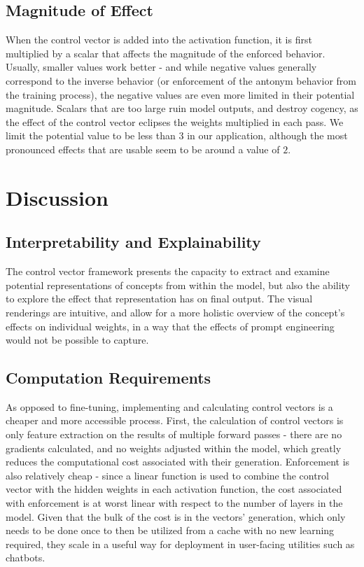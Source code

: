 \documentclass[11pt,a4paper]{article}
\begin{document}
\subsection{Magnitude of Effect}
When the control vector is added into the activation function, it is first multiplied by a scalar that affects the magnitude of the enforced behavior. Usually, smaller values work better - and while negative values generally correspond to the inverse behavior (or enforcement of the antonym behavior from the training process), the negative values are even more limited in their potential magnitude. Scalars that are too large ruin model outputs, and destroy cogency, as the effect of the control vector eclipses the weights multiplied in each pass. We limit the potential value to be less than $3$ in our application, although the most pronounced effects that are usable seem to be around a value of $2$.

\section{Discussion}
\subsection{Interpretability and Explainability}
The control vector framework presents the capacity to extract and examine potential representations of concepts from within the model, but also the ability to explore the effect that representation has on final output. The visual renderings are intuitive, and allow for a more holistic overview of the concept's effects on individual weights, in a way that the effects of prompt engineering would not be possible to capture. 

\subsection{Computation Requirements}
As opposed to fine-tuning, implementing and calculating control vectors is a cheaper and more accessible process. First, the calculation of control vectors is only feature extraction on the results of multiple forward passes - there are no gradients calculated, and no weights adjusted within the model, which greatly reduces the computational cost associated with their generation. Enforcement is also relatively cheap - since a linear function is used to combine the control vector with the hidden weights in each activation function, the cost associated with enforcement is at worst linear with respect to the number of layers in the model. Given that the bulk of the cost is in the vectors' generation, which only needs to be done once to then  be utilized from a cache with no new learning required, they scale in a useful way for deployment in user-facing utilities such as chatbots.
\end{document}
